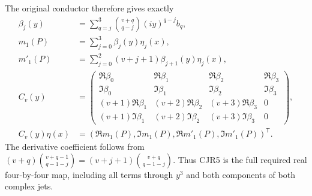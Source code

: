 \documentclass[11pt]{article}
\begin{document}
The original conductor therefore gives exactly
\[
 \begin{split}
 \beta_j(y)&=\sum_{q=j}^3\binom{v+q}{q-j}(iy)^{q-j}b_q,\\
 m_1(P)&=\sum_{j=0}^3\beta_j(y)\eta_j(x),\\
 m'_1(P)&=\sum_{j=0}^2(v+j+1)\beta_{j+1}(y)\eta_j(x),\\
 C_v(y)&=\begin{pmatrix}
 \Re\beta_0&\Re\beta_1&\Re\beta_2&\Re\beta_3\\
 \Im\beta_0&\Im\beta_1&\Im\beta_2&\Im\beta_3\\
 (v+1)\Re\beta_1&(v+2)\Re\beta_2&(v+3)\Re\beta_3&0\\
 (v+1)\Im\beta_1&(v+2)\Im\beta_2&(v+3)\Im\beta_3&0
 \end{pmatrix},\\
 C_v(y)\eta(x)&=(\Re m_1(P),\Im m_1(P),
                         \Re m'_1(P),\Im m'_1(P))^{\mathsf T}.
 \end{split}\tag{CJR5}
\]
The derivative coefficient follows from
$(v+q)\binom{v+q-1}{q-1-j}=(v+j+1)\binom{v+q}{q-1-j}$.
Thus CJR5 is the full required real four-by-four map, including
all terms through $y^3$ and both components of both complex jets.
\end{document}
